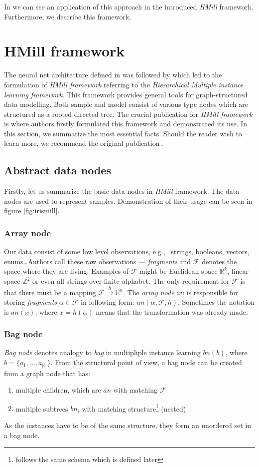 In \cite{Mandlik2020} we can see an application of this approach in the introduced \emph{HMill} framework. Furthermore, we describe this framework.

\section{HMill framework}
The neural net architecture defined in \cite{Pevny2016a} was followed by \cite{Mandlik2020} which led to the formulation of \emph{HMill framework} referring to the \emph{Hierarchical Multiple instance learning framework}. This framework provides general tools for graph-structured data modelling. Both sample and model consist of various type nodes which are structured as a rooted directed tree. The crucial publication for \emph{HMill framework} is \cite{Mandlik2020} where authors firstly formulated this framework and demonstrated its use. In this section, we summarize the most essential facts. Should the reader wish to learn more, we recommend the original publication \cite{Mandlik2020}.

\subsection{Abstract data nodes}
Firstly, let us summarize the basic data nodes in \emph{HMill} framework. The data nodes are used to represent samples. Demonstration of their usage can be seen in figure \ref{fig:irismill}.
\subsubsection{Array node}
Our data consist of some low level observations, e.g., \ strings, booleans, vectors, enums\dots Authors call these raw observations --- \emph{fragments} and $\mathcal{F}$ denotes the space where they are living. Examples of $\mathcal{F}$ might be Euclidean space $\mathbb{R}^{k}$, linear space $\mathbb{Z}^{2}$ or even all strings over finite alphabet. The only requirement for $\mathcal{F}$ is that there must be a mapping $\mathcal{F}\xrightarrow{h}\mathbb{R}^{n}$. The \emph{array node} $an$ is responsible for storing \emph{fragments} $\alpha\in\mathcal{F}$ in following form: $an(\alpha,\mathcal{F},h)$. Sometimes the notation is $an(x)$, where $x=h(\alpha)$ means that the transformation was already made.

\subsubsection{Bag node}
\emph{Bag node} denotes analogy to \emph{bag} in multipliple instance learning $bn(b)$, where $b=\{a_1,\dots,a_{|b|}\}$. 
From the structural point of view, a bag node can be created from a graph node that has:
\begin{enumerate}
    \itemsep0em 
	\item multiple children, which are $an$ with matching $\mathcal{F}$
	\item multiple subtrees $bn_i$ with matching structure\footnote{follows the same schema which is defined later} (nested)
\end{enumerate}
As the instances have to be of the same structure, they form an unordered set in a bag node.

